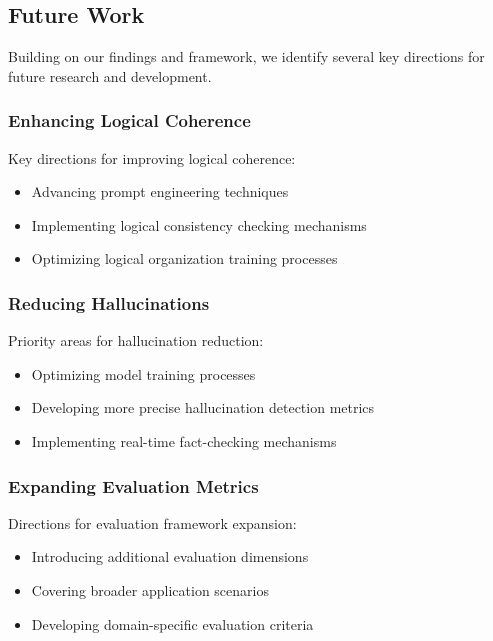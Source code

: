 \vspace{0.5em}
\subsection{Future Work}
Building on our findings and framework, we identify several key directions for future research and development.

\vspace{0.5em}
\subsubsection{Enhancing Logical Coherence}
Key directions for improving logical coherence:
\begin{itemize}
    \item Advancing prompt engineering techniques
    \item Implementing logical consistency checking mechanisms
    \item Optimizing logical organization training processes
\end{itemize}

\vspace{0.5em}
\subsubsection{Reducing Hallucinations}
Priority areas for hallucination reduction:
\begin{itemize}
    \item Optimizing model training processes
    \item Developing more precise hallucination detection metrics
    \item Implementing real-time fact-checking mechanisms
\end{itemize}

\vspace{0.5em}
\subsubsection{Expanding Evaluation Metrics}
Directions for evaluation framework expansion:
\begin{itemize}
    \item Introducing additional evaluation dimensions
    \item Covering broader application scenarios
    \item Developing domain-specific evaluation criteria
\end{itemize}


